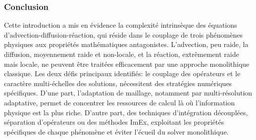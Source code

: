 \subsubsection{Conclusion}
Cette introduction a mis en évidence la complexité intrinsèque des équations d'advection-diffusion-réaction, 
qui réside dans le couplage de trois phénomènes physiques aux propriétés mathématiques antagonistes. 
L'advection, peu raide, la diffusion, moyennement raide et non-locale, et la réaction, extrêmement raide mais locale, 
ne peuvent être traitées efficacement par une approche monolithique classique.
Les deux défis principaux identifiés: le couplage des opérateurs et le caractère multi-échelles des solutions, 
nécessitent des stratégies numériques spécifiques. 
D'une part, l'adaptation de maillage, notamment par multi-résolution adaptative, permet de concentrer les ressources de calcul là où l'information physique est la plus riche. 
D'autre part, des techniques d'intégration découplées, séparation d'opérateurs ou des méthodes ImEx, exploitant les propriétés spécifiques de chaque phénomène et éviter l'écueil du solver monolithique.
